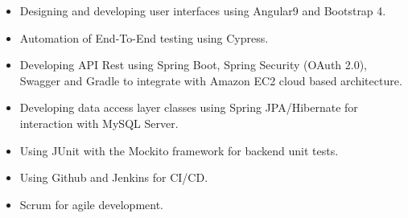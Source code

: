 \documentclass[10pt,a4paper,ragged2e]{altacv}
\begin{document}

\begin{fullwidth}
\makecvheader
\end{fullwidth}




\begin{itemize}
    \item Designing and developing user interfaces using Angular9 and Bootstrap 4.
    \item Automation of End-To-End testing using Cypress.
    \item Developing API Rest using Spring Boot, Spring Security (OAuth 2.0), Swagger and Gradle to integrate with Amazon EC2 cloud based architecture.
    \item Developing data access layer classes using Spring JPA/Hibernate for interaction with MySQL Server.
    \item Using JUnit with the Mockito framework for backend unit tests.
    \item Using Github and Jenkins for CI/CD.
    \item Scrum for agile development.
\end{itemize}
\end{document}
